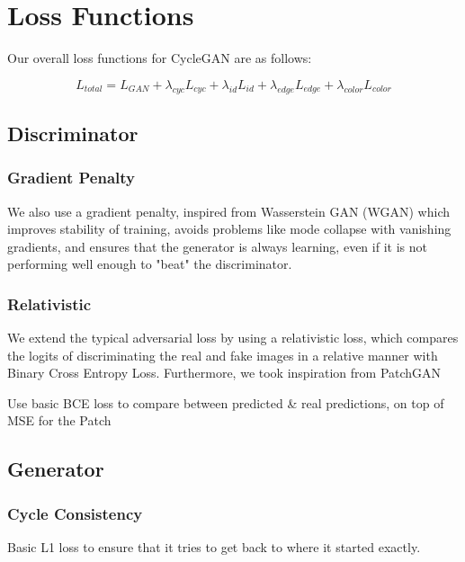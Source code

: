 \documentclass[twoside,english,notitlepage]{report}
\begin{document}
\section{Loss Functions}
Our overall loss functions for CycleGAN are as follows:


\begin{equation}
    L_{total} = L_{GAN} + \lambda_{cyc} L_{cyc} + \lambda_{id} L_{id} + \lambda_{edge} L_{edge} + \lambda_{color} L_{color}
\end{equation}

\subsection{Discriminator}

\subsubsection{Gradient Penalty}
We also use a gradient penalty, inspired from Wasserstein GAN (WGAN) which improves stability of training, avoids problems like mode collapse with vanishing gradients, and ensures that the generator is always learning, even if it is not performing well enough to "beat" the discriminator. 

\subsubsection{Relativistic}
We extend the typical adversarial loss by using a relativistic loss, which compares the logits of discriminating the real and fake images in a relative manner with Binary Cross Entropy Loss. Furthermore, we took inspiration from PatchGAN

Use basic BCE loss to compare between predicted \& real predictions, on top of MSE for the Patch  

\subsection{Generator}
\subsubsection{Cycle Consistency}
Basic L1 loss to ensure that it tries to get back to where it started exactly. 
\end{document}
